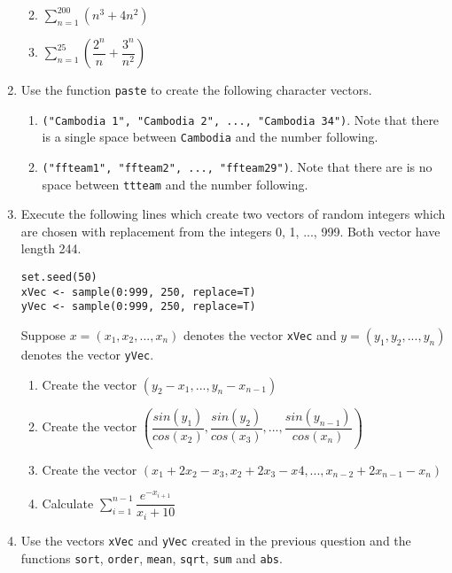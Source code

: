 \documentclass[11pt,a4paper]{article}
\begin{document}
\begin{enumerate}
	\begin{multicols}{2}
		\begin{enumerate}
			\everymath{\displaystyle}  
			\item $\sum_{n=1}^{200}(n^{3}+4n^{2})$
			\item $\sum_{n=1}^{25}(\dfrac{2^{n}}{n} + \dfrac{3^{n}}{n^{2}})$ 
		\end{enumerate}
	\end{multicols}
	
	\item Use the function \texttt{paste} to create the following character vectors. 
	\begin{enumerate}
		\item \texttt{("Cambodia 1", "Cambodia 2", ..., "Cambodia 34")}. Note that there is a single space between \texttt{Cambodia} and the number following. 
		\item \texttt{("ffteam1", "ffteam2", ..., "ffteam29")}. Note that there are is no space between \texttt{ttteam} and the number following.  
	\end{enumerate}

	\item Execute the following lines which create two vectors of random integers which are chosen with replacement from the integers 0, 1, ..., 999. Both vector have length 244. 
	
	\texttt{set.seed(50) \\
	xVec <- sample(0:999, 250, replace=T)\\
	yVec <- sample(0:999, 250, replace=T)}

	Suppose $x = (x_{1}, x_{2}, ..., x_{n})$ denotes the vector \texttt{xVec} and $y = (y_{1}, y_{2}, ..., y_{n})$ denotes the vector \texttt{yVec}.
	
	\begin{enumerate}
		\item Create the vector $(y_{2}-x_{1}, ..., y_{n}-x_{n-1})$
		\item Create the vector $\left ( \dfrac{sin(y_{1})}{cos(x_{2})}, \dfrac{sin(y_{2})}{cos(x_{3})}, ..., \dfrac{sin(y_{n-1})}{cos(x_{n})}\right )$
		\item Create the vector $(x_{1} + 2x_{2} - x_{3}, x_{2} + 2x_{3} - x{4}, ..., x_{n-2} +2x_{n-1} - x_{n})$
		\everymath{\displaystyle}  
		\item Calculate $\sum_{i=1}^{n-1} \dfrac{e^{-x_{i+1}}}{x_{i} + 10}$
	\end{enumerate}

	\item Use the vectors \texttt{xVec} and \texttt{yVec} created in the previous question and the functions \texttt{sort}, \texttt{order}, \texttt{mean}, \texttt{sqrt}, \texttt{sum} and \texttt{abs}. 
	

\end{enumerate}
\end{document}
